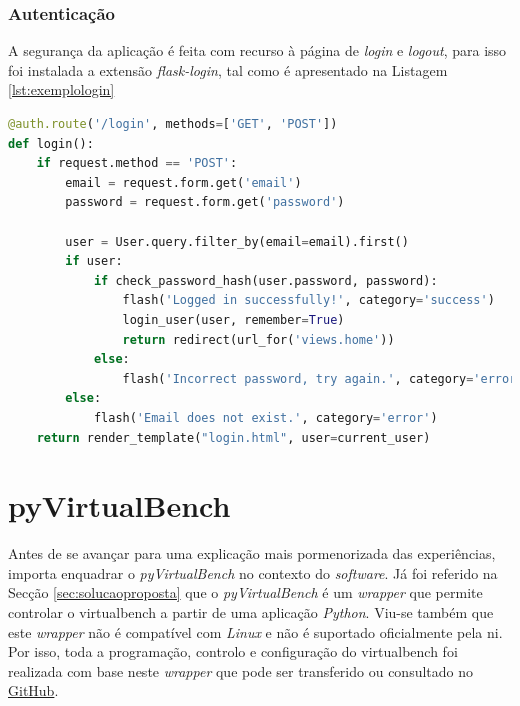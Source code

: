 \subsubsection{Autenticação}
A segurança da aplicação é feita com recurso à página de \textit{login} e \textit{logout}, para isso foi instalada a extensão \textit{flask-login}, tal como é apresentado na Listagem \ref{lst:exemplologin}

\begin{minipage}{0.9\linewidth}
	\begin{lstlisting}[language=Python, caption=Exemplo autenticação \textit{login}, label=lst:exemplologin]
@auth.route('/login', methods=['GET', 'POST'])
def login():
    if request.method == 'POST':
        email = request.form.get('email')
        password = request.form.get('password')

        user = User.query.filter_by(email=email).first()
        if user:
            if check_password_hash(user.password, password):
                flash('Logged in successfully!', category='success')
                login_user(user, remember=True)
                return redirect(url_for('views.home'))
            else:
                flash('Incorrect password, try again.', category='error')
        else:
            flash('Email does not exist.', category='error')
    return render_template("login.html", user=current_user) 
\end{lstlisting}
\end{minipage}

\section{pyVirtualBench}
\label{sec:pyvirtualbench}
Antes de se avançar para uma explicação mais pormenorizada das experiências, importa enquadrar o \textit{pyVirtualBench} no contexto do \textit{software}. Já foi referido na Secção \ref{sec:solucaoproposta} que o \textit{pyVirtualBench} é um \textit{wrapper} que permite controlar o \acrshort{virtualbench} a partir de uma aplicação \textit{Python}. Viu-se também que este \textit{wrapper} não é compatível com \textit{Linux} e não é suportado oficialmente pela \acrshort{ni}. Por isso, toda a programação, controlo e configuração do \acrshort{virtualbench} foi realizada com base neste \textit{wrapper} que pode ser transferido ou consultado no \href{https://github.com/armstrap/armstrap-pyvirtualbench/tree/master}{GitHub}.

